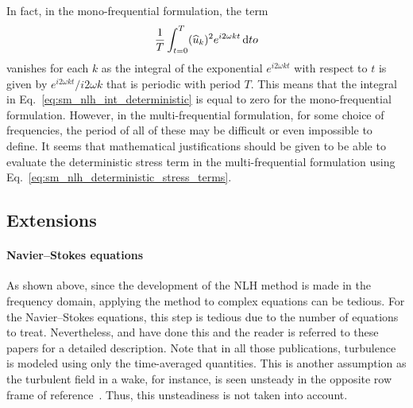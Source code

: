 In fact, in the mono-frequential formulation, the term
\begin{equation}
	\frac{1}{T} \int_{t=0}^{T} (\widehat{u}_k)^2
		e^{i 2 \omega k t} \diff to
	\label{eq:sm_nlh_int_deterministic}
\end{equation}
vanishes for each $k$ as the integral of the
exponential $e^{i 2 \omega k t}$ with respect to $t$
is given by $e^{i 2 \omega k t} / i 2 \omega k$ that is
periodic with period $T$. This means that the integral in 
Eq.~\eqref{eq:sm_nlh_int_deterministic} is equal to zero
for the mono-frequential formulation. 
However, in the multi-frequential
formulation, for some choice of frequencies, the period of all
of these may be difficult or even impossible to define. It
seems that mathematical justifications should be given
to be able to evaluate the deterministic stress term 
in the multi-frequential formulation
using Eq.~\eqref{eq:sm_nlh_deterministic_stress_terms}.

\subsection{Extensions}

\paragraph{Navier--Stokes equations}
As shown above, since the development of the NLH
method is made in the frequency domain, applying the method to
complex equations can be tedious. For the Navier--Stokes equations,
this step is tedious due to the number of equations to treat. Nevertheless, 
\citet{He1998, Chen2001, He2002} and \citet{Vilmin2006} have
done this and the reader is referred to these papers
for a detailed description.
Note that in all those publications, turbulence is modeled
using only the time-averaged quantities.
This is another assumption as the turbulent field in a wake,
for instance, is seen unsteady in the opposite row frame
of reference~\cite{Lakshminarayana1980}. Thus, this
unsteadiness is not taken into account.


